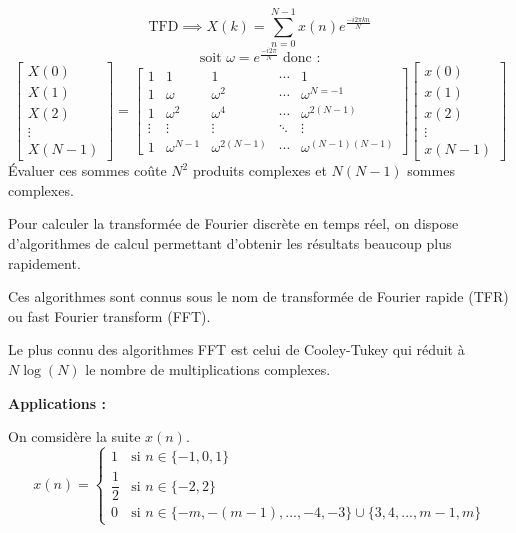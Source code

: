 \documentclass[a4paper,12pt]{report}
\begin{document}
\begin{defi}
    \[ \mathrm{TFD} \implies X(k) = \sum_{n=0}^{N-1} x(n) e^{\frac{-i2\pi kn}{N}} \]
    \[ \text{soit } \omega = e^{\frac{-i2\pi}{N}} \text{ donc :} \]
    \[ \begin{bmatrix}
        X(0) \\
        X(1) \\
        X(2) \\
        \vdots \\
        X(N-1)
    \end{bmatrix}
    = \begin{bmatrix}
        1 & 1 & 1 & \cdots & 1 \\
        1 & \omega & \omega^2 & \cdots & \omega^{N=-1} \\
        1 & \omega^2 & \omega^4 & \cdots & \omega^{2(N-1)} \\
        \vdots & \vdots & \vdots & \ddots & \vdots \\
        1 & \omega^{N-1} & \omega^{2(N-1)} & \cdots & \omega^{(N-1)(N-1)}
    \end{bmatrix} \begin{bmatrix}
        x(0) \\
        x(1) \\
        x(2) \\
        \vdots \\
        x(N-1)
    \end{bmatrix} \]
    Évaluer ces sommes coûte $N^2$ produits complexes et $N(N-1)$ sommes complexes.

    Pour calculer la transformée de Fourier discrète en temps réel, on dispose d'algorithmes de calcul permettant d'obtenir les résultats beaucoup plus rapidement.

    Ces algorithmes sont connus sous le nom de transformée de Fourier rapide (TFR) ou fast Fourier transform (FFT).

    Le plus connu des algorithmes FFT est celui de Cooley-Tukey qui réduit à $N \log(N)$ le nombre de multiplications complexes.
\end{defi}

\textbf{Applications :}

On comsidère la suite $x(n)$.
\[ x(n) = \begin{cases}
    1 & \text{si } n \in \{ -1, 0, 1 \} \\
    \dfrac{1}{2} & \text{si } n \in \{ -2, 2 \} \\
    0 & \text{si } n \in \{ -m, -(m-1), ..., -4, -3 \} \cup \{ 3, 4, ..., m-1, m \}
\end{cases} \]
\end{document}
